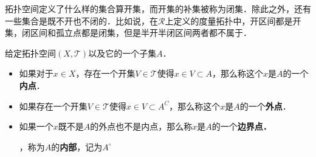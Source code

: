 
拓扑空间定义了什么样的集合算开集，而开集的补集被称为闭集．除此之外，还有一些集合是既不开也不闭的．比如说，在$\mathcal{R}$上定义的度量拓扑中，开区间都是开集，闭区间和孤立点都是闭集，但是半开半闭区间两者都不属于．

\begin{definition}{}
给定拓扑空间$(X, \mathcal{T})$以及它的一个子集$A$．
\begin{itemize}
\item 如果对于$x\in X$，存在一个开集$V\in \mathcal{T}$使得$x\in V\subset A$，那么称这个$x$是$A$的一个\textbf{内点}．
\item 如果存在一个开集$V\in \mathcal{T}$使得$x\in V\subset A^C$，那么称这个$x$是$A$的一个\textbf{外点}．
\item 如果一个$x$既不是$A$的外点也不是内点，那么称$x$是$A$的一个\textbf{边界点．}

，称为$A$的\textbf{内部}，记为$A^\circ$
\end{itemize}
\end{definition}{}
